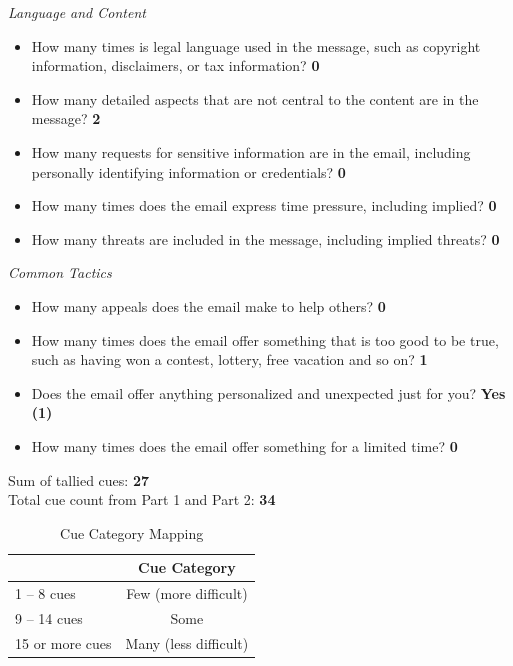 \begin{fullwidth}
\textit{Language and Content}
\begin{itemize}
    \item How many times is legal language used in the message, such as copyright
information, disclaimers, or tax information? \textbf{0}
    \item How many detailed aspects that are not central to the content are in the
message? \textbf{2}
    \item How many requests for sensitive information are in the email, including
personally identifying information or credentials? \textbf{0}
    \item How many times does the email express time pressure, including implied? \textbf{0}
    \item How many threats are included in the message, including implied threats? \textbf{0}
\end{itemize}

\textit{Common Tactics}
\begin{itemize}
    \item How many appeals does the email make to help others? \textbf{0}
    \item How many times does the email offer something that is too good to be true,
such as having won a contest, lottery, free vacation and so on? \textbf{1}
    \item Does the email offer anything personalized and unexpected just for you? \textbf{Yes (1)}
    \item How many times does the email offer something for a limited time? \textbf{0}
\end{itemize}

Sum of tallied cues: \textbf{27}\\\medskip
Total cue count from Part 1 and Part 2: \textbf{34}

\begin{table}[H]
\centering
\begin{tabular}{|l|c|}
\hline
\rowcolor[HTML]{96BEE6} 
\multicolumn{1}{|c|}{\cellcolor[HTML]{96BEE6}\textbf{Total Cue Count}} & \textbf{Cue Category} \\ \hline
1 – 8 cues                                                             & Few (more difficult)  \\ \hline
9 – 14 cues                                                            & Some                  \\ \hline
15 or more cues                                                        & Many (less difficult) \\ \hline
\end{tabular}
\captionsetup{justification=centering}
\caption{Cue Category Mapping}
\end{table}


\end{fullwidth}
